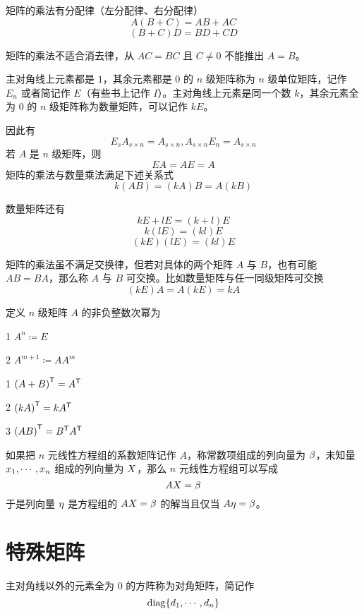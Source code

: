 \begin{theorem}
    矩阵的乘法有分配律（左分配律、右分配律）
    \[A(B+C) = AB+AC\]
    \[(B+C)D = BD + CD\]
\end{theorem}

矩阵的乘法不适合消去律，从 $AC = BC$ 且 $C\ne 0$ 不能推出 $A=B$。

主对角线上元素都是 $1$，其余元素都是 $0$ 的 $n$ 级矩阵称为 $n$ 级单位矩阵，记作 $E_n$ 或者简记作 $E$（有些书上记作 $I$）。主对角线上元素是同一个数 $k$，其余元素全为 $0$ 的 $n$ 级矩阵称为数量矩阵，可以记作 $kE$。

因此有
\[E_s A_{s\times n} = A_{s\times n}, A_{s\times n} E_n= A_{s\times n}\]
若 $A$ 是 $n$ 级矩阵，则
\[EA = AE = A\]
矩阵的乘法与数量乘法满足下述关系式
\[k(AB) = (kA)B = A(kB)\]

数量矩阵还有
\[kE + lE = (k+l)E\]
\[k(lE) = (kl)E\]
\[(kE)(lE) = (kl)E\]

矩阵的乘法虽不满足交换律，但若对具体的两个矩阵 $A$ 与 $B$，也有可能 $AB = BA$，那么称 $A$ 与 $B$ 可交换。比如数量矩阵与任一同级矩阵可交换
\[(kE)A = A(kE) = kA\]

\begin{definition}
    定义 $n$ 级矩阵 $A$ 的非负整数次幂为

    \num{1} $A^n \coloneqq  E$

    \num{2} $A^{m+1} \coloneqq  AA^m$
\end{definition}


\begin{theorem}
    \num{1} ${(A+B)}^\mathsf{T} = {A}^\mathsf{T}$
    
    \num{2} ${(kA)}^\mathsf{T} = k{A}^\mathsf{T}$
    
    \num{3} ${(AB)}^\mathsf{T} = {B}^\mathsf{T}{A}^\mathsf{T}$
\end{theorem}

如果把 $n$ 元线性方程组的系数矩阵记作 $A$，称常数项组成的列向量为 $\beta$，未知量 $x_1,\cdots,x_n$ 组成的列向量为 $X$，那么 $n$ 元线性方程组可以写成
\[AX = \beta\]
于是列向量 $\eta$ 是方程组的 $AX = \beta$ 的解当且仅当 $A\eta = \beta$。

\section{特殊矩阵}

\begin{definition}
    主对角线以外的元素全为 $0$ 的方阵称为对角矩阵，简记作
    \[\operatorname{diag}\{d_1,\cdots,d_n\}\]
\end{definition}


